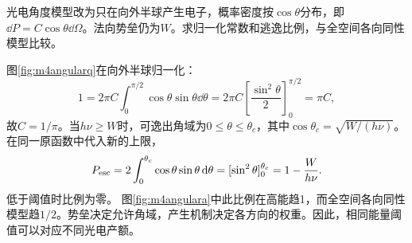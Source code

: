 \begin{exercise}\label{ex:m4angularvariant}
光电角度模型改为只在向外半球产生电子，概率密度按$\cos\theta$分布，即$\dd P=C\cos\theta\dd\Omega$。法向势垒仍为$W$。求归一化常数和逃逸比例，与全空间各向同性模型比较。
\end{exercise}
\begin{solution}
图\ref{fig:m4angularq}在向外半球归一化：
\[
 1=2\pi C\int_0^{\pi/2}\cos\theta\sin\theta\dd\theta
 =2\pi C\left[\frac{\sin^2\theta}{2}\right]_0^{\pi/2}
 =\pi C,
\]
故$C=1/\pi$。当$h\nu\geq W$时，可逸出角域为$0\leq\theta\leq\theta_c$，其中$\cos\theta_c=\sqrt{W/(h\nu)}$。在同一原函数中代入新的上限，
\[
 P_{\rm esc}=2\int_0^{\theta_c}\cos\theta\sin\theta\mathop{}\!\mathrm d\theta
 =[\sin^2\theta]_0^{\theta_c}=1-\frac W{h\nu}.
\]
低于阈值时比例为零。
图\ref{fig:m4angulara}中此比例在高能趋1，而全空间各向同性模型趋$1/2$。势垒决定允许角域，产生机制决定各方向的权重。因此，相同能量阈值可以对应不同光电产额。
\end{solution}

